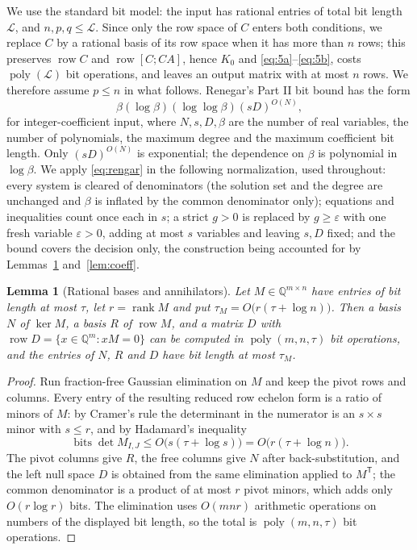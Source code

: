 \documentclass[journal]{IEEEtran}
\theoremstyle{plainn}
\newtheorem{lem}[thm]{Lemma}
\theoremstyle{remark}
\begin{document}
We use the standard bit model: the input has rational entries of total bit length $\mathcal L$,
and $n,p,q\le\mathcal L$. Since only the row space of $C$ enters both conditions, we replace $C$ by
a rational basis of its row space when it has more than $n$ rows; this preserves $\operatorname{row}C$
and $\operatorname{row}[C;CA]$, hence $K_0$ and \eqref{eq:5a}--\eqref{eq:5b}, costs
$\operatorname{poly}(\mathcal L)$ bit operations, and leaves an output matrix with at most $n$ rows.
We therefore assume $p\le n$ in what follows. Renegar's Part II bit bound
\cite{ren92} has the form
\begin{equation}\label{eq:rengar}
\beta(\log\beta)(\log\log\beta)(sD)^{O(N)},
\end{equation}
for integer-coefficient input, where $N,s,D,\beta$ are the number of real variables, the number of
polynomials, the maximum degree and the maximum coefficient bit length. Only $(sD)^{O(N)}$ is
exponential; the dependence on $\beta$ is polynomial in $\log\beta$. We apply \eqref{eq:rengar} in the
following normalization, used throughout: every system is cleared of denominators (the solution set
and the degree are unchanged and $\beta$ is inflated by the common denominator only); equations and
inequalities count once each in $s$; a strict $g>0$ is replaced by $g\ge\varepsilon$ with one fresh
variable $\varepsilon>0$, adding at most $s$ variables and leaving $s,D$ fixed; and the bound covers
the decision only, the construction being accounted for by Lemmas~\ref{lem:rationalbasis}
and~\ref{lem:coeff}.

\begin{lem}[Rational bases and annihilators]\label{lem:rationalbasis}
Let $M\in\mathbb Q^{m\times n}$ have entries of bit length at most $\tau$, let $r=\operatorname{rank}M$
and put $\tau_M=O\bigl(r(\tau+\log n)\bigr)$. Then a basis $N$ of $\ker M$, a basis $R$ of
$\operatorname{row}M$, and a matrix $D$ with $\operatorname{row}D=\{x\in\mathbb Q^m:xM=0\}$ can be
computed in $\operatorname{poly}(m,n,\tau)$ bit operations, and the entries of $N$, $R$ and $D$ have
bit length at most $\tau_M$.
\end{lem}

\begin{proof}
Run fraction-free Gaussian elimination on $M$ and keep the pivot rows and columns. Every entry of the
resulting reduced row echelon form is a ratio of minors of $M$: by Cramer's rule the determinant in
the numerator is an $s\times s$ minor with $s\le r$, and by Hadamard's inequality
\begin{equation*}
\operatorname{bits}\det M_{I,J}\le O\bigl(s(\tau+\log s)\bigr)=O\bigl(r(\tau+\log n)\bigr).
\end{equation*}
The pivot columns give $R$, the free columns give $N$ after back-substitution, and the left null
space $D$ is obtained from the same elimination applied to $M^{\mathsf T}$; the common denominator
is a product of at most $r$ pivot minors, which adds only $O(r\log r)$ bits. The elimination uses
$O(mnr)$ arithmetic operations on numbers of the displayed bit length, so the total is
$\operatorname{poly}(m,n,\tau)$ bit operations.
\end{proof}
\end{document}
